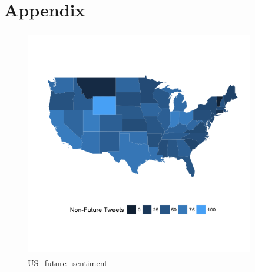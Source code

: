 \documentclass{article}
\begin{document}
\pagebreak{}




\pagebreak{}
\section{Appendix}

\begin{figure}[h!]
\centering
\includegraphics[width=10cm,height=10cm]{Non_future_tweets.png}
    \caption{US_future_sentiment}
\end{figure}
\end{document}
